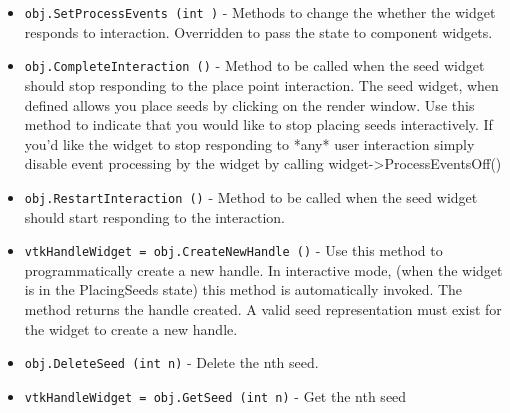 \begin{itemize}
\item  \verb|obj.SetProcessEvents (int )| -  Methods to change the whether the widget responds to interaction.
 Overridden to pass the state to component widgets.

\item  \verb|obj.CompleteInteraction ()| -  Method to be called when the seed widget should stop responding to
 the place point interaction. The seed widget, when defined allows you 
 place seeds by clicking on the render window. Use this method to 
 indicate that you would like to stop placing seeds interactively. If
 you'd like the widget to stop responding to *any* user interaction
 simply disable event processing by the widget by calling
   widget->ProcessEventsOff()

\item  \verb|obj.RestartInteraction ()| -  Method to be called when the seed widget should start responding
 to the interaction.  

\item  \verb|vtkHandleWidget = obj.CreateNewHandle ()| -  Use this method to programmatically create a new handle. In interactive 
 mode, (when the widget is in the PlacingSeeds state) this method is 
 automatically invoked. The method returns the handle created.
 A valid seed representation must exist for the widget to create a new
 handle.

\item  \verb|obj.DeleteSeed (int n)| -  Delete the nth seed.

\item  \verb|vtkHandleWidget = obj.GetSeed (int n)| -  Get the nth seed

\end{itemize}
